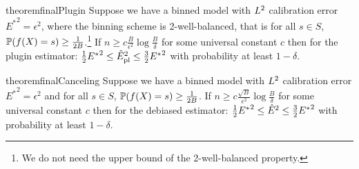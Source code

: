 
\begin{restatable}{theorem}{finalPlugin}
\label{thm:final-plugin}
  Suppose we have a binned model with $L^2{}$ calibration error ${E^*}^2 = \epsilon^2$, where the binning scheme is 2-well-balanced, that is for all $s \in S$, $\mathbb{P}(f(X) = s) \geq \frac{1}{2B}$.\footnote{We do not need the upper bound of the 2-well-balanced property.} If $n \geq c\frac{B}{\epsilon^2}\log{\frac{B}{\delta}}$ for some universal constant $c$ then for the plugin estimator: $\frac{1}{2} {E^*}^2 \leq \hat{E}_{\textup{pl}}^2{} \leq \frac{3}{2} {E^*}^2$ with probability at least $1 - \delta$.
\end{restatable}

\begin{restatable}{theorem}{finalCanceling}
\label{thm:final-ours}
  Suppose we have a binned model with $L^2{}$ calibration error ${E^*}^2 = \epsilon^2$ and for all $s \in S$, $\mathbb{P}(f(X) = s) \geq \frac{1}{2B}$. If $n \geq c\frac{\sqrt{B}}{\epsilon^2}\log{\frac{B}{\delta}}$ for some universal constant $c$ then for the debiased estimator: $\frac{1}{2} {E^*}^2 \leq \hat{E}^2{} \leq \frac{3}{2}{E^*}^2$ with probability at least $1 - \delta$.
\end{restatable}


